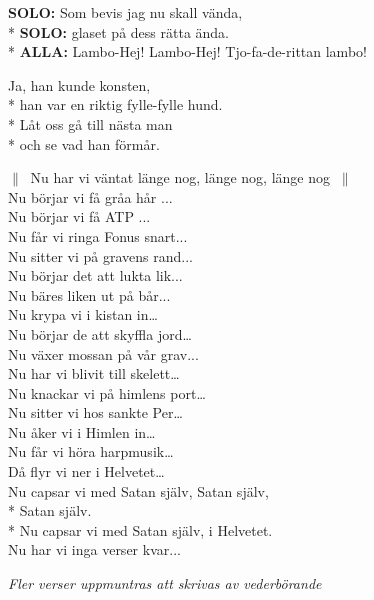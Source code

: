 \begin{SongText}[Lambo]
\begin{SongVerse}
        \textbf{SOLO:} Som bevis jag nu skall vända,\\*%
        \textbf{SOLO:} glaset på dess rätta ända.\\*%
        \textbf{ALLA:} Lambo-Hej! Lambo-Hej! Tjo-fa-de-rittan lambo!
    \end{SongVerse}
    \begin{SongVerse}
        Ja, han kunde konsten,\\*%
        han var en riktig fylle-fylle hund.\\*%
        Låt oss gå till nästa man\\*%
        och se vad han förmår.
    \end{SongVerse}
\end{SongText}
\begin{SongText}
    \begin{SongVerse}
        $\|\:$ Nu har vi väntat länge nog, länge nog, länge nog $\:\|$\\%
        Nu börjar vi få gråa hår ...\\%
        Nu börjar vi få ATP ...\\%
        Nu får vi ringa Fonus snart...\\%
        Nu sitter vi på gravens rand...\\%
        Nu börjar det att lukta lik...\\%
        Nu bäres liken ut på bår...\\%
        Nu krypa vi i kistan in…\\%
        Nu börjar de att skyffla jord…\\%
        Nu växer mossan på vår grav...\\%
        Nu har vi blivit till skelett…\\%
        Nu knackar vi på himlens port…\\%
        Nu sitter vi hos sankte Per…\\%
        Nu åker vi i Himlen in…\\%
        Nu får vi höra harpmusik…\\%
        Då flyr vi ner i Helvetet…\\%
        Nu capsar vi med Satan själv, Satan själv,\\*%
        Satan själv.\\*%
        Nu capsar vi med Satan själv, i Helvetet.\\%
        Nu har vi inga verser kvar...
    \end{SongVerse}
    \begin{SongVerse}
        \textit{Fler verser uppmuntras att skrivas av vederbörande}
        \hrulefill%
        

\end{SongVerse}
\end{SongText}
